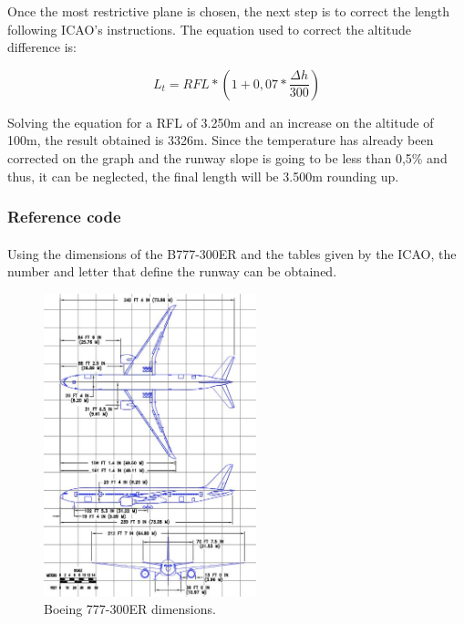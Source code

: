 			Once the most restrictive plane is chosen, the next step is to correct the length following ICAO’s instructions. The equation used to correct the altitude difference is:
			
			\[L_t=RFL*(1+0,07*\frac{\Delta h}{300})\]
			
			Solving the equation for a RFL of 3.250m and an increase on the altitude of 100m, the result obtained is 3326m.
			Since the temperature has already been corrected on the graph and the runway slope is going to be less than 0,5\% and thus, it can be neglected, the final length will be 3.500m rounding up.
		
			\subsubsection{Reference code}
			\paragraph{}Using the dimensions of the B777-300ER and the tables given by the ICAO, the number and letter that define the runway can be obtained. 
			
			\begin{figure}[H]
				\centering
				\includegraphics[clip, trim=0cm 0cm 0cm 0cm, width=0.55\textwidth]{./images/B777/Dimensions777}
				\caption{Boeing 777-300ER dimensions.} %
				\label{} %
			\end{figure}
				
